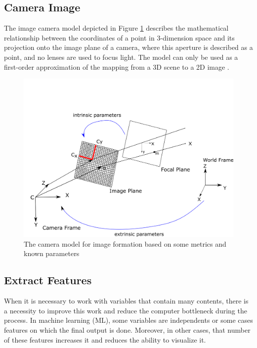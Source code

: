 \subsection{Camera Image}

The image camera model depicted in Figure \ref{fig:image_formation} describes the mathematical relationship between the coordinates of a point in 3-dimension space and its projection onto
the image plane of a camera, where this aperture is described as a point, and no lenses are used to focus light. The model can only be used as a first-order approximation of the mapping from a 3D scene to a 2D image \cite{forsyth2002computer}.




\begin{figure}[H]
\centering
\includegraphics[width=\textwidth]{imagens/image_formation.png}
\caption{The camera model for image formation based on some metrics and known parameters}
\label{fig:image_formation}
\end{figure}

\subsection{Extract Features}

When it is necessary to work with variables that contain many contents, there is a necessity to improve this work and reduce the computer bottleneck during the process. In machine learning (ML), some variables are independents or some cases features on which the final output is done. Moreover, in other cases, that number of these features increases it and reduces the ability to visualize it. 

